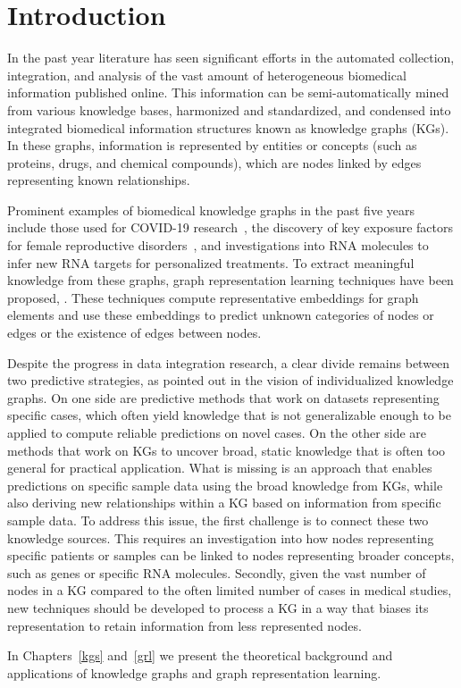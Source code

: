 \chapter{Introduction}
In the past year literature has seen significant efforts in the automated collection, integration, and analysis of the vast amount of heterogeneous biomedical information published online. This information can be semi-automatically mined from various knowledge bases, harmonized and standardized, and condensed into integrated biomedical information structures known as knowledge graphs (KGs). In these graphs, information is represented by entities or concepts (such as proteins, drugs, and chemical compounds), which are nodes linked by edges representing known relationships.

Prominent examples of biomedical knowledge graphs in the past five years include those used for COVID-19 research~\cite{ReeseJustinT.2021KAFt}, the discovery of key exposure factors for female reproductive disorders~\cite{ChanLaurenE2024Pnae}, and investigations into RNA molecules to infer new RNA targets for personalized treatments\cite{CavalleriEmanuele2024Aokg}. To extract meaningful knowledge from these graphs, graph representation learning techniques have been proposed\cite{Hamilton2020GraphRL}, \cite{li2022graphrepresentationlearningbiomedicine}. These techniques compute representative embeddings for graph elements and use these embeddings to predict unknown categories of nodes or edges or the existence of edges between nodes.

Despite the progress in data integration research, a clear divide remains between two predictive strategies, as pointed out in the vision of individualized knowledge graphs\cite{PingPeipei2017IKGA}. On one side are predictive methods that work on datasets representing specific cases, which often yield knowledge that is not generalizable enough to be applied to compute reliable predictions on novel cases. On the other side are methods that work on KGs to uncover broad, static knowledge that is often too general for practical application. What is missing is an approach that enables predictions on specific sample data using the broad knowledge from KGs, while also deriving new relationships within a KG based on information from specific sample data. To address this issue, the first challenge is to connect these two knowledge sources. This requires an investigation into how nodes representing specific patients or samples can be linked to nodes representing broader concepts, such as genes or specific RNA molecules. Secondly, given the vast number of nodes in a KG compared to the often limited number of cases in medical studies, new techniques should be developed to process a KG in a way that biases its representation to retain information from less represented nodes.

In Chapters~\ref{kgs} and~\ref{grl} we present the theoretical background and applications of knowledge graphs and graph representation learning.